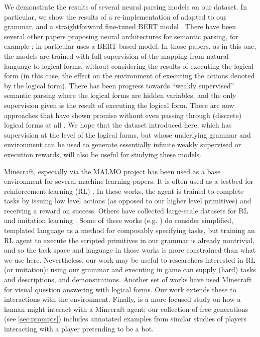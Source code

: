  

We demonstrate the results of several neural parsing models on our dataset.  In particular, we show the results of a re-implementation of \cite{dong2016language} adapted to our grammar, and a straightforward fine-tuned BERT model \cite{devlin2018bert}. There have been several other papers proposing neural architectures for semantic parsing, for example \cite{jia2016data, zhong2017seq2sql, wang2018transfer, hwang2019comprehensive}; in particular \cite{hwang2019comprehensive} uses a BERT based model.  In those papers, as in this one, the models are trained with full supervision of the mapping from natural language to logical forms, without considering the results of executing the logical form (in this case, the effect on the environment of executing the actions denoted by the logical form). There has been progress towards ``weakly supervised'' semantic parsing
 \cite{artzi2013weakly, liang2016neural, guu2017language} where the logical forms are hidden variables, and the only supervision given is the result of executing the logical form. There are now approaches that have shown promise without even passing through (discrete) logical forms at all \cite{riedel2016programming, neelakantan2016learning}.  We hope that the dataset introduced here, which has supervision at the level of the logical forms, but whose underlying grammar and environment can be used to generate essentially infinite weakly supervised or execution rewards, will also be useful for studying these models.


Minecraft, especially via the MALMO project \cite{johnson2016malmo} has been used as a base environment for several machine learning papers. It is often used as a testbed for reinforcement learning (RL) \cite{shu2017hierarchical,udagawa2016fighting,alaniz2018deep,oh2016control,tessler2017deep}. In these works, the agent is trained to complete tasks by issuing low level actions (as opposed to our higher level primitives) and receiving a reward on success.  Others have collected large-scale datasets for RL and imitation learning \cite{guss2019minerlCompetition, guss2019minerl}.   Some of these works (e.g. \cite{oh2017zero}) do consider simplified, templated language as a method for composably specifying tasks, but training an RL agent to execute the scripted primitives in our grammar is already nontrivial, and so the task space and language in those works is more constrained  than what we use here.  Nevertheless, our work may be useful to researchers interested in RL (or imitation): using our grammar and executing in game can supply (hard) tasks and descriptions, and demonstrations.
Another set of works \cite{kitaev2017misty, yi2018neural} have used Minecraft for visual question answering with logical forms. Our work extends these to interactions with the environment.
Finally, \cite{allison2018players} is a more focused study on how a human might interact with a Minecraft agent; our collection of free generations (see \ref{sec:prompts}) includes annotated 
examples from similar studies of players interacting with a player pretending to be a bot.


